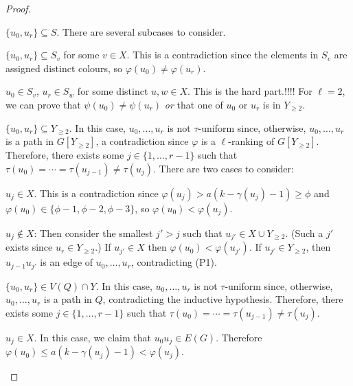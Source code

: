 \documentclass[kpfonts]{patmorin}
\theoremstyle{named}
\begin{document}
\begin{proof}
\begin{compactenum}[(1)]
        \item $\{u_0,u_r\}\subseteq S$. There are several subcases to consider.
        \begin{compactenum}
            \item $\{u_0,u_r\}\subseteq S_v$ for some $v\in X$.  This is a contradiction since the elements in $S_v$ are assigned distinct colours, so $\varphi(u_0)\neq\varphi(u_r)$.

            \item $u_0\in S_v$, $u_r\in S_w$ for some distinct $u,w\in X$. This is the hard part.!!!!  For $\ell=2$, we can prove that $\psi(u_0)\neq\psi(u_r)$ \emph{or} that one of $u_0$ or $u_r$ is in $Y_{\ge 2}$.
        \end{compactenum}

        \item $\{u_0,u_r\}\subseteq Y_{\ge 2}$. In this case, $u_0,\ldots,u_r$ is not $\tau$-uniform since, otherwise, $u_0,\ldots,u_r$ is a path in $G[Y_{\ge 2}]$, a contradiction since $\varphi$ is a $\ell$-ranking of $G[Y_{\ge 2}]$.  Therefore, there exists some
        $j\in\{1,\ldots,r-1\}$ such that $\tau(u_0)=\cdots=\tau(u_{j-1})\neq \tau(u_j)$.  There are two cases to consider:
        \begin{compactenum}
            \item $u_j\in X$. This is a contradiction since $\varphi(u_j)>a(k-\gamma(u_j)-1)\ge\phi$ and $\varphi(u_0)\in \{\phi-1,\phi-2,\phi-3\}$, so $\varphi(u_0)<\varphi(u_j)$.

            \item $u_j\not\in X$: Then consider the smallest $j'>j$ such that $u_{j'}\in X\cup Y_{\ge 2}$.  (Such a $j'$ exists since $u_r\in Y_{\ge 2}$.)  If $u_{j'}\in X$ then $\varphi(u_0)<\varphi(u_{j'})$. If $u_{j'}\in Y_{\ge 2}$, then $u_{j-1}u_{j'}$ is an edge of $u_0,\ldots,u_r$, contradicting (P1).
        \end{compactenum}

        \item $\{u_0,u_r\}\in V(Q)\cap Y$.  In this case, $u_0,\ldots,u_r$ is not $\tau$-uniform since, otherwise, $u_0,\ldots,u_r$ is a path in $Q$, contradicting the inductive hypothesis.
        Therefore, there exists some $j\in\{1,\ldots,r-1\}$ such that $\tau(u_0)=\cdots=\tau(u_{j-1})\neq \tau(u_j)$.
        \begin{compactenum}
            \item $u_j\in X$. In this case, we claim that $u_0u_j\in E(G)$. Therefore $\varphi(u_0) \le a(k-\gamma(u_j)-1) < \varphi(u_j)$.


\end{compactenum}
\end{compactenum}
\end{proof}
\end{document}
